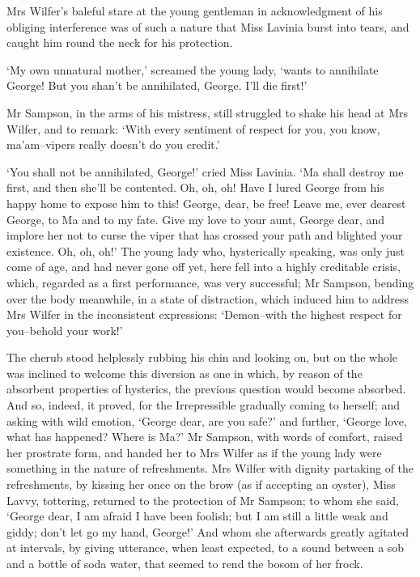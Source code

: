 Mrs Wilfer’s baleful stare at the young gentleman in acknowledgment of
his obliging interference was of such a nature that Miss Lavinia burst
into tears, and caught him round the neck for his protection.

‘My own unnatural mother,’ screamed the young lady, ‘wants to annihilate
George! But you shan’t be annihilated, George. I’ll die first!’

Mr Sampson, in the arms of his mistress, still struggled to shake his
head at Mrs Wilfer, and to remark: ‘With every sentiment of respect for
you, you know, ma’am--vipers really doesn’t do you credit.’

‘You shall not be annihilated, George!’ cried Miss Lavinia. ‘Ma shall
destroy me first, and then she’ll be contented. Oh, oh, oh! Have I lured
George from his happy home to expose him to this! George, dear, be free!
Leave me, ever dearest George, to Ma and to my fate. Give my love to
your aunt, George dear, and implore her not to curse the viper that has
crossed your path and blighted your existence. Oh, oh, oh!’ The young
lady who, hysterically speaking, was only just come of age, and had
never gone off yet, here fell into a highly creditable crisis, which,
regarded as a first performance, was very successful; Mr Sampson,
bending over the body meanwhile, in a state of distraction, which
induced him to address Mrs Wilfer in the inconsistent expressions:
‘Demon--with the highest respect for you--behold your work!’

The cherub stood helplessly rubbing his chin and looking on, but on the
whole was inclined to welcome this diversion as one in which, by reason
of the absorbent properties of hysterics, the previous question would
become absorbed. And so, indeed, it proved, for the Irrepressible
gradually coming to herself; and asking with wild emotion, ‘George dear,
are you safe?’ and further, ‘George love, what has happened? Where is
Ma?’ Mr Sampson, with words of comfort, raised her prostrate form, and
handed her to Mrs Wilfer as if the young lady were something in the
nature of refreshments. Mrs Wilfer with dignity partaking of the
refreshments, by kissing her once on the brow (as if accepting an
oyster), Miss Lavvy, tottering, returned to the protection of Mr
Sampson; to whom she said, ‘George dear, I am afraid I have been
foolish; but I am still a little weak and giddy; don’t let go my hand,
George!’ And whom she afterwards greatly agitated at intervals, by
giving utterance, when least expected, to a sound between a sob and a
bottle of soda water, that seemed to rend the bosom of her frock.

